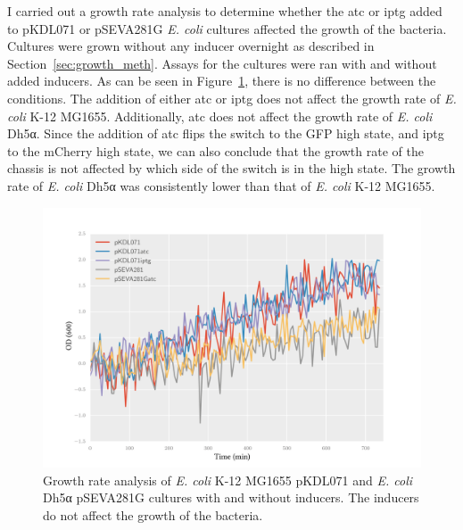 I carried out a growth rate analysis to determine whether the \acrshort{atc} or \acrshort{iptg} added to pKDL071 or pSEVA281G \textit{E. coli} cultures affected the growth of the bacteria. Cultures were grown without any inducer overnight as described in Section~\ref{sec:growth_meth}. Assays for the cultures were ran with and without added inducers. As can be seen in Figure~\ref{fig:growth_curve}, there is no difference between the conditions. The addition of either \acrshort{atc} or \acrshort{iptg} does not affect the growth rate of \textit{E. coli} K-12 MG1655. Additionally, \acrshort{atc} does not affect the growth rate of \textit{E. coli} Dh5α. Since the addition of \acrshort{atc} flips the switch to the GFP high state, and \acrshort{iptg} to the mCherry high state, we can also conclude that the growth rate of the chassis is not affected by which side of the switch is in the high state. The growth rate of \textit{E. coli} Dh5α was consistently lower than that of \textit{E. coli} K-12 MG1655.

\begin{figure}[htbp]
	\begin{center}
		\includegraphics[scale=0.6]{../../chapters/chapterABCFlow/images/growth_curves.png}
		\caption[Growth rate curves of cultures with and without inducers]{\label{fig:growth_curve} Growth rate analysis of \textit{E. coli} K-12 MG1655 pKDL071 and \textit{E. coli} Dh5α pSEVA281G cultures with and without inducers. The inducers do not affect the growth of the bacteria. }
	\end{center}
\end{figure}

\clearpage



